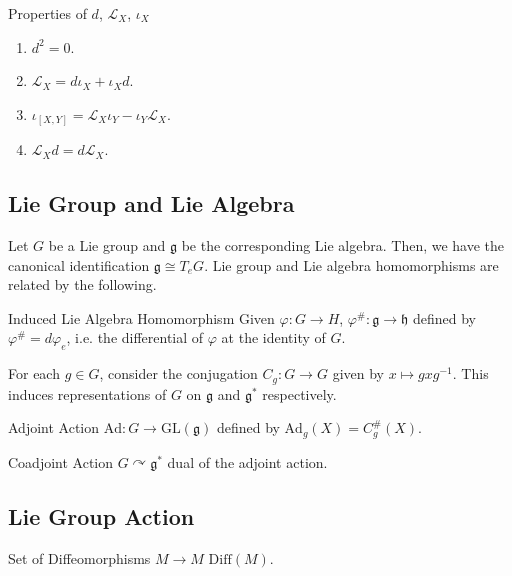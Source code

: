 \documentclass[b5paper,final]{article}
\newcommand{\Diff}{\mathrm{Diff}}
\newcommand{\acton}{\curvearrowright}
\newcommand{\ind}[1]{#1^\#}
\newcommand{\lied}[1]{\mathcal{L}_{#1}}
\newcommand{\intd}[1]{\iota_{#1}}
\begin{document}
\begin{lemma}{Properties of $d$, $\lied{X}$, $\intd{X}$} \strut
    \begin{enumerate}
        \item $d^2 = 0$.
        \item $\lied{X} = d\intd{X} + \intd{X}d$.
        \item $\intd{[X, Y]} = \lied{X}\intd{Y} - \intd{Y}\lied{X}$.
        \item $\lied{X}d = d\lied{X}$.
    \end{enumerate}
\end{lemma}

\subsection{Lie Group and Lie Algebra}

Let $G$ be a Lie group and $\mathfrak{g}$ be the corresponding Lie algebra. Then, we have the canonical identification $\mathfrak{g} \cong T_eG$. Lie group and Lie algebra homomorphisms are related by the following.
\begin{definition}{Induced Lie Algebra Homomorphism}
    Given $\varphi : G \to H$, $\ind{\varphi} : \mathfrak{g} \to \mathfrak{h}$ defined by $\ind{\varphi} = d\varphi_e$, i.e. the differential of $\varphi$ at the identity of $G$.
\end{definition}

For each $g \in G$, consider the conjugation $C_g : G \to G$ given by $x \mapsto gxg^{-1}$. This induces representations of $G$ on $\mathfrak{g}$ and $\mathfrak{g}^*$ respectively.

\begin{definition}{Adjoint Action}
    $\mathrm{Ad} : G \to \mathrm{GL}(\mathfrak{g})$ defined by $\mathrm{Ad}_g(X) = \ind{C_g}(X)$.
\end{definition}

\begin{definition}{Coadjoint Action}
    $G \acton \mathfrak{g}^*$ dual of the adjoint action.
\end{definition}

\subsection{Lie Group Action}

\begin{notation}{Set of Diffeomorphisms $M \to M$}
    $\Diff(M)$.
\end{notation}
\end{document}
